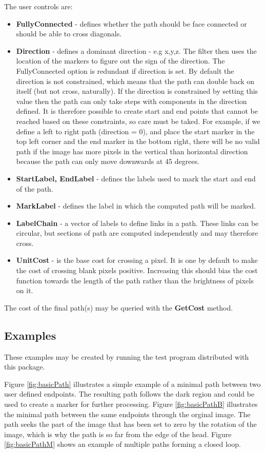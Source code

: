 \documentclass{InsightArticle}
\begin{document}
The user controls are:
\begin{itemize}
\item {\bf FullyConnected} - defines whether the path should be face 
connected or should be able to cross diagonals.
\item {\bf Direction} - defines a dominant direction - e.g x,y,z. 
The filter then uses the location of the markers to figure out the
sign of the direction. The FullyConnected option is redundant if
direction is set. By default the direction is not constrained, which
means that the path can double back on itself (but not cross,
naturally). If the direction is constrained by setting this value then
the path can only take steps with components in the direction
defined. It is therefore possible to create start and end points that
cannot be reached based on these constraints, so care must be
taked. For example, if we define a left to right path (direction = 0),
and place the start marker in the top left corner and the end marker
in the bottom right, there will be no valid path if the image has more
pixels in the vertical than horizontal direction because the path can
only move downwards at 45 degrees.
\item {\bf StartLabel, EndLabel} - defines the labels used to mark the 
start and end of the path.
\item {\bf MarkLabel} - defines the label in which the computed path 
will be marked.
\item {\bf LabelChain} - a vector of labels to define links in a path. 
These links can be circular, but sections of path are computed
independently and may therefore cross.
\item {\bf UnitCost} - is the base cost for crossing a pixel. It is one 
by default to make the cost of crossing blank pixels
positive. Increasing this should bias the cost function towards the
length of the path rather than the brightness of pixels on it.
\end{itemize}

The cost of the final path(s) may be queried with the {\bf GetCost} method.

\subsection{Examples}
These examples may be created by running the test program distributed with this package.

Figure \ref{fig:basicPath} illustrates a simple example of a minimal
path between two user defined endpoints. The resulting path follows
the dark region and could be used to create a marker for further
processing. Figure \ref{fig:basicPathB} illustrates the minimal path
between the same endpoints through the orginal image. The path seeks
the part of the image that has been set to zero by the rotation of the
image, which is why the path is so far from the edge of the
head. Figure \ref{fig:basicPathM} shows an example of multiple paths
forming a closed loop.
\end{document}
